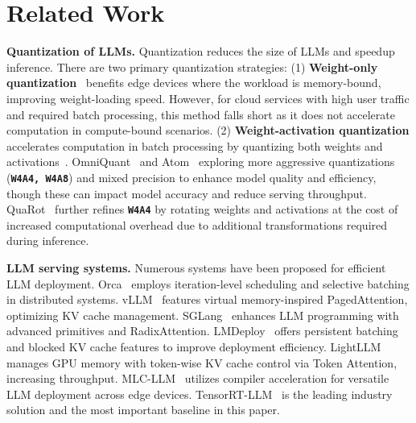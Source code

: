 
\section{Related Work}

\vspace{3pt}
\textbf{Quantization of LLMs.}
Quantization reduces the size of LLMs and speedup inference. There are two primary quantization strategies:
(1) \textbf{Weight-only quantization}~\cite{gptq,lin2023awq,dettmers2023spqr,kim2024squeezellm} benefits edge devices where the workload is memory-bound, improving weight-loading speed. However, for cloud services with high user traffic and required batch processing, this method falls short as it does not accelerate computation in compute-bound scenarios.
(2) \textbf{Weight-activation quantization} accelerates computation in batch processing by quantizing both weights and activations~\cite{llmint8,wei2022outlier,xiao2023smoothquant}. OmniQuant~\cite{OmniQuant} and Atom~\cite{zhao2023atom} exploring more aggressive quantizations (\textbf{\texttt{W4A4, W4A8}}) and mixed precision to enhance model quality and efficiency, though these can impact model accuracy and reduce serving throughput. QuaRot~\cite{ashkboos2024quarot} further refines \textbf{\texttt{W4A4}} by rotating weights and activations at the cost of increased computational overhead due to additional transformations required during inference.



\vspace{3pt}
\textbf{LLM serving systems.}
Numerous systems have been proposed for efficient LLM deployment. Orca~\cite{orca} employs iteration-level scheduling and selective batching in distributed systems. vLLM~\cite{vllm} features virtual memory-inspired PagedAttention, optimizing KV cache management. SGLang~\cite{sglang} enhances LLM programming with advanced primitives and RadixAttention. LMDeploy~\cite{lmdeploy} offers persistent batching and blocked KV cache features to improve deployment efficiency. LightLLM~\cite{lightllm} manages GPU memory with token-wise KV cache control via Token Attention, increasing throughput. MLC-LLM~\cite{mlcllm} utilizes compiler acceleration for versatile LLM deployment across edge devices. TensorRT-LLM~\cite{trtllm} is the leading industry solution and the most important baseline in this paper.



